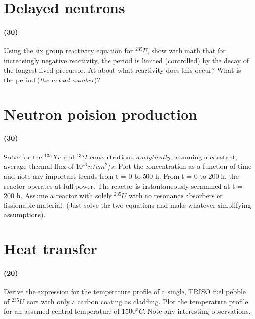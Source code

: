 \documentclass[11pt,a4paper]{article}
\begin{document}
\newpage

\section{Delayed neutrons}
\paragraph*{(30)}
Using the six group reactivity equation for $^{235}U$, show with math that for increasingly negative reactivity, the period is limited (controlled) by the decay of the longest lived precursor. At about what reactivity does this occur? What is the period (\textit{the actual number})?





\newpage

\section{Neutron poision production}
\paragraph*{(30)}
Solve for the $^{135}Xe$ and $^{135}I$ concentrations \textit{analytically}, assuming a constant, average thermal flux of $10^{14} n/cm^2/s$. Plot the concentration as a function of time and note any important trends from t = 0 to 500 h. From t = 0 to 200 h, the reactor operates at full power. The reactor is instantaneously scrammed at t = 200 h. Assume a reactor with solely $^{235}U$ with no resonance absorbers or fissionable material. (Just solve the two equations and make whatever simplifying assumptions).





\newpage

\section{Heat transfer}
\paragraph*{(20)}
Derive the expression for the temperature profile of a single, TRISO fuel pebble of $^{235}U$ core with only a carbon coating as cladding. Plot the temperature profile for an assumed central temperature of $1500^o C$. Note any interesting observations.
\end{document}
